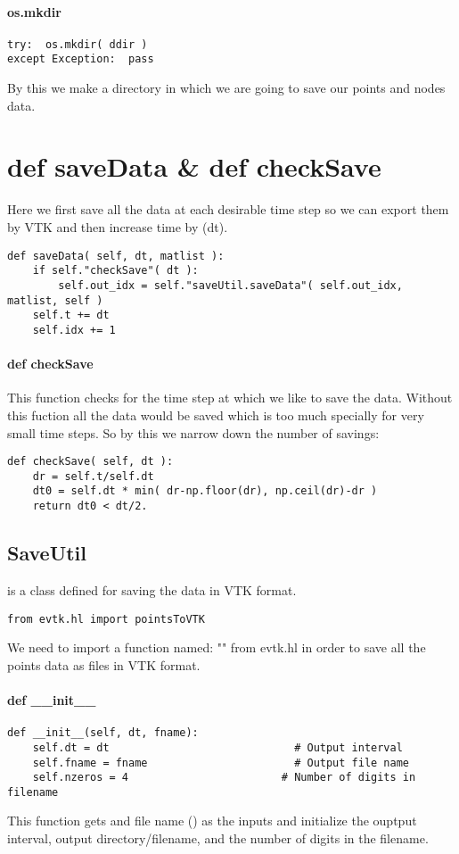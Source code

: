 \documentclass[11pt,fleqn]{book} %
\begin{document}
\paragraph{os.mkdir}
\begin{lstlisting}
try:  os.mkdir( ddir )	    
except Exception:  pass
\end{lstlisting}
By this we make a directory in which we are going to save our points and nodes data. 

\section{def saveData \& def checkSave}
Here we first save all the data at each desirable time step so we can export them by VTK and then increase time by (dt).
\begin{lstlisting}
def saveData( self, dt, matlist ):
	if self."checkSave"( dt ):
	    self.out_idx = self."saveUtil.saveData"( self.out_idx, matlist, self )
	self.t += dt
	self.idx += 1
\end{lstlisting}
\paragraph{def checkSave}
This function checks for the time step at which we like to save the data. Without this fuction all the data would be saved which is too much specially for very small time steps. So by this we narrow down the number of savings:
\begin{lstlisting}
def checkSave( self, dt ):
	dr = self.t/self.dt
	dt0 = self.dt * min( dr-np.floor(dr), np.ceil(dr)-dr )
	return dt0 < dt/2.
\end{lstlisting}
\subsection{SaveUtil}
 is a class defined for saving the data in VTK format.
\begin{lstlisting}
from evtk.hl import pointsToVTK
\end{lstlisting}
We need to import a function named: "" from evtk.hl in order to save all the points data as files in VTK format.
\paragraph{def \_\_init\_\_}
\begin{lstlisting}
def __init__(self, dt, fname):
	self.dt = dt                             # Output interval
	self.fname = fname                       # Output file name
	self.nzeros = 4                        # Number of digits in filename
\end{lstlisting}
This function gets  and file name () as the inputs and initialize the ouptput interval, output directory/filename, and the number of digits in the filename.
\end{document}
